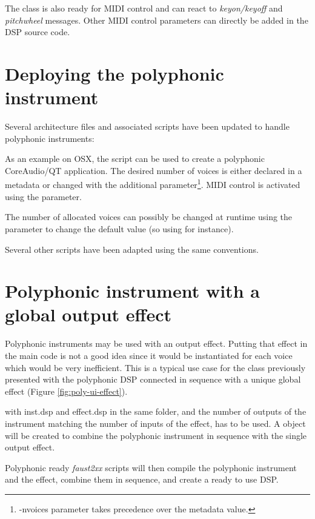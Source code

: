 The  class is also ready for MIDI control and can react to {\it keyon/keyoff} and {\it pitchwheel} messages. Other MIDI control parameters can directly be added in the DSP source code. 

\section{Deploying the polyphonic instrument}

Several architecture files and associated scripts have been updated to handle polyphonic instruments:

As an example on OSX, the script  can be used to create a polyphonic CoreAudio/QT application. The desired number of voices is either declared in a  metadata or changed with the  additional parameter\footnote{-nvoices parameter takes precedence over the  metadata value.}. MIDI control is activated using the  parameter. 

The number of allocated voices can possibly be changed at runtime using the  parameter to change the default value (so using  for instance). 

Several other scripts have been adapted using the same conventions.

\section{Polyphonic instrument with a global output effect}

Polyphonic instruments may be used with an output effect. Putting that effect in the main \faust code is not a good idea since it would be instantiated for each voice which would be very inefficient. This is a typical use case for the   class previously presented with the polyphonic DSP connected in sequence with a unique global effect (Figure \ref{fig:poly-ui-effect}). 

 with inst.dsp and effect.dsp in the same folder,  and the number of outputs of the instrument matching the number of inputs of the effect, has to be used. A  object will be created to combine the polyphonic instrument in sequence with the single output effect. 

Polyphonic ready  {\it faust2xx} scripts will then compile the polyphonic instrument and the effect, combine them in sequence, and create a ready to use DSP.  


